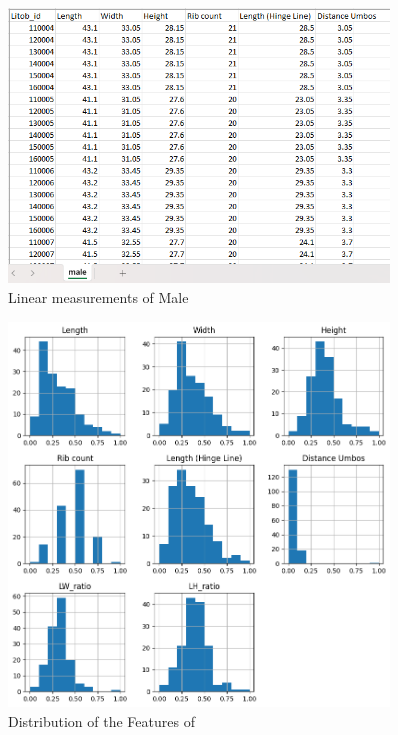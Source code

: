 \begin{figure}[!htbp]
	\centering
	\includegraphics[width=0.9\textwidth]{figures/male_dataset.png}
	\caption{Linear measurements of Male \Tegillarcagranosa}
\end{figure}

\begin{figure}[!htbp]
	\centering
	\includegraphics[width=0.9\textwidth]{figures/sample_distribution.png}
	\caption{Distribution of the Features of \Tegillarcagranosa}
\end{figure}


